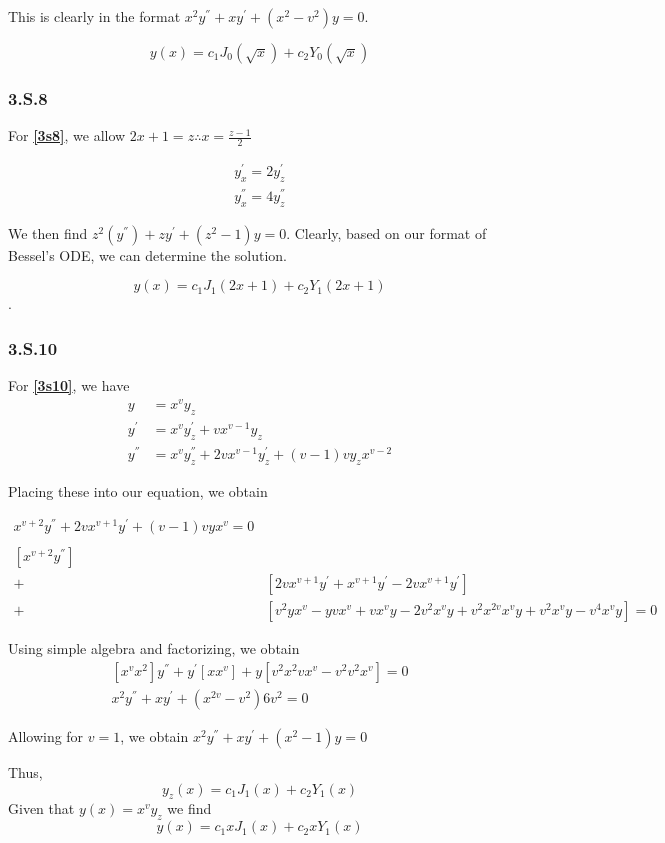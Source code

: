 \documentclass{article}
\begin{document}
This is clearly in the format $x^2y^{''}+xy^{'}+(x^2-v^2)y=0$.

$$y(x) = c_1 J_0 (\sqrt{x}) + c_2 Y_0 (\sqrt{x})$$
\par
\subsubsection*{3.S.8}

For \textbf{\eqref{3s8}}, we allow $2x+1=z \therefore x=\frac{z-1}{2}$

\begin{align*}
y_x^{'} = 2y_z^{'}\\
y_x^{''} = 4y_z^{''}
\end{align*}

We then find $z^2(y^{''})+zy^{'}+(z^2-1)y = 0$.
Clearly, based on our format of Bessel's ODE, we can determine the solution.

$$y(x) = c_1 J_1 (2x+1) + c_2 Y_1 (2x+1)$$.
\par
\subsubsection*{3.S.10}

For \textbf{\eqref{3s10}}, we have 
\begin{align*}
y &= x^vy_z\\
y^{'} &= x^vy_z^{'}+vx^{v-1}y_z\\
y^{''} &= x^vy_z^{''} + 2vx^{v-1}y_z^{'}+(v-1)vy_zx^{v-2}
\end{align*}

Placing these into our equation, we obtain

\begin{align*}
x^{v+2}y^{''} + 2vx^{v+1}y^{'} + (v-1)vyx^{v} = 0\\\\
\left[x^{v+2}y^{''}\right] & \\
+ &\left[2vx^{v+1}y^{'} + x^{v+1}y^{'} - 2vx^{v+1}y^{'} \right]\\
+ &\left[v^2yx^v - yvx^v + vx^vy - 2v^2x^vy + v^2x^{2v}x^vy + v^2x^vy - v^4x^vy \right] = 0
\end{align*}

Using simple algebra and factorizing, we obtain
\begin{align*}
\left[x^vx^2\right]y^{''}+y^{'}\left[xx^v\right]+y\left[v^2x^2vx^v-v^2v^2x^v\right] = 0\\
x^2y^{''}+xy^{'}+(x^{2v}-v^2)6v^2=0
\end{align*}

Allowing for $v=1$, we obtain $x^2y^{''}+xy^{'}+(x^2-1)y=0$

Thus,
\begin{equation*}
y_z(x) = c_1 J_1(x) + c_2 Y_1(x)
\end{equation*}
Given that $y(x) = x^v y_z$ we find
\begin{equation*}
y(x) = c_1 x J_1(x) + c_2 x Y_1(x)
\end{equation*}
\end{document}

